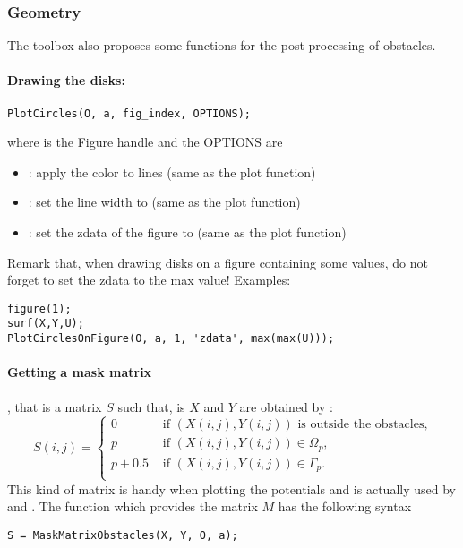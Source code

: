  
\subsubsection{Geometry}

The \mudiff toolbox also proposes some functions for the post processing of obstacles. 
\paragraph{Drawing the disks:}
\begin{verbatim}
PlotCircles(O, a, fig_index, OPTIONS);
\end{verbatim}
where  is the Figure handle and the OPTIONS are
\begin{itemize}
\item {}: apply the  color to lines (same as the plot function)
\item {}: set the line width to  (same as the plot function)
\item {}: set the zdata of the figure to  (same as the plot function)
\end{itemize}
Remark that, when drawing disks on a figure containing some values, do not forget to set the zdata to the max value! Examples: 
\begin{verbatim}
figure(1);
surf(X,Y,U);
PlotCirclesOnFigure(O, a, 1, 'zdata', max(max(U)));
\end{verbatim}

\paragraph{Getting a mask matrix}, that is a matrix $S$ such that, is $X$ and $Y$ are obtained by :
$$
S(i,j) = \begin{cases}
0 & \text{ if } (X(i,j),Y(i,j)) \text{ is outside the obstacles,}\\
p & \text{ if } (X(i,j),Y(i,j)) \in\Omega_p,\\
p+0.5 & \text{ if } (X(i,j),Y(i,j)) \in\Gamma_p.\\
\end{cases}
$$
This kind of matrix is handy when plotting the potentials and is actually used by  and . The function  which provides the matrix $M$ has the following syntax
\begin{verbatim}
S = MaskMatrixObstacles(X, Y, O, a);
\end{verbatim}

